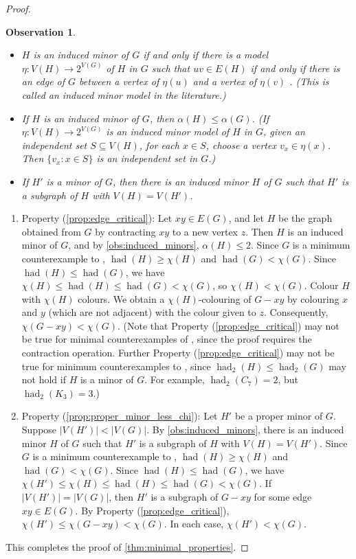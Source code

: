 \documentclass[11pt]{article}
\numberwithin{equation}{section}
\theoremstyle{plain}
\newtheorem{obs}[equation]{Observation}
\theoremstyle{definition}
\renewcommand{\geq}{\geqslant}
\renewcommand{\leq}{\leqslant}
\DeclareMathOperator{\had}{had}
\newcommand{\defn}[1]{\textcolor{green!50!black}{\textit{#1}}}
\newcommand{\propref}[1]{\textup{(\ref{#1})}}
\begin{document}
\begin{proof}
\begin{obs}
        \phantom{linebreaker}
        \begin{itemize}
            \item $H$ is an induced minor of $G$ if and only if there is a model $\eta: V(H) \to 2^{V(G)}$ of $H$ in $G$ such that $uv \in E(H)$ if and only if there is an edge of $G$ between a vertex of $\eta(u)$ and a vertex of $\eta(v)$ \citep{InducedMinors24}. (This is called an \defn{induced minor model} in the literature.)
            \item If $H$ is an induced minor of $G$, then $\alpha(H) \leq \alpha(G)$. (If $\eta: V(H) \to 2^{V(G)}$ is an induced minor model of $H$ in $G$, given an independent set $S \subseteq V(H)$, for each $x \in S$, choose a vertex $v_x \in \eta(x)$. Then $\{v_x: x \in S\}$ is an independent set in $G$.)
            \item If $H'$ is a minor of $G$, then there is an induced minor $H$ of $G$ such that $H'$ is a subgraph of $H$ with $V(H) = V(H')$.
        \end{itemize}
    \end{obs}
    \begin{enumerate}[label={}, leftmargin=0em, itemsep=1.5pt]
        \item Property \propref{prop:edge_critical}: Let $xy \in E(G)$, and let $H$ be the graph obtained from $G$ by contracting $xy$ to a new vertex $z$. Then $H$ is an induced minor of $G$, and by \cref{obs:induced_minors}, $\alpha(H) \leq 2$. Since $G$ is a minimum counterexample to , $\had(H) \geq \chi(H)$ and $\had(G) < \chi(G)$. Since $\had(H) \leq \had(G)$, we have $\chi(H) \leq \had(H) \leq \had(G) < \chi(G)$, so $\chi(H) < \chi(G)$. Colour $H$ with $\chi(H)$ colours. We obtain a $\chi(H)$-colouring of $G - xy$ by colouring $x$ and $y$ (which are not adjacent) with the colour given to $z$. Consequently, $\chi(G - xy) < \chi(G)$. (Note that Property \propref{prop:edge_critical} may not be true for minimal counterexamples of , since the proof requires the contraction operation. Further Property \propref{prop:edge_critical} may not be true for minimum counterexamples to , since $\had_2(H) \leq \had_2(G)$ may not hold if $H$ is a minor of $G$. For example, $\had_2(C_7) = 2$, but $\had_2(K_3) = 3$.)
        \item Property \propref{prop:proper_minor_less_chi}: Let $H'$ be a proper minor of $G$. Suppose $|V(H')| < |V(G)|$.  By \cref{obs:induced_minors}, there is an induced minor $H$ of $G$ such that $H'$ is a subgraph of $H$ with $V(H) = V(H')$. Since $G$ is a minimum counterexample to , $\had(H) \geq \chi(H)$ and $\had(G) < \chi(G)$. Since $\had(H) \leq \had(G)$, we have $\chi(H') \leq \chi(H) \leq \had(H) \leq \had(G) < \chi(G)$.
              If $|V(H')| = |V(G)|$, then $H'$ is a subgraph of $G-xy$ for some edge $xy \in E(G)$. By Property \propref{prop:edge_critical}, $\chi(H') \leq \chi(G - xy) < \chi(G)$. In each case, $\chi(H') < \chi(G)$.
    \end{enumerate}
    This completes the proof of \cref{thm:minimal_properties}.
\end{proof}
\end{document}
